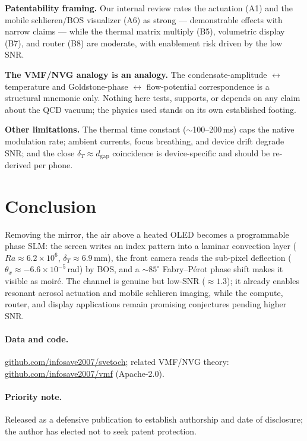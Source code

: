 \documentclass[11pt]{article}
\begin{document}
\textbf{Patentability framing.} Our internal review rates the actuation (A1) and the mobile
schlieren/BOS visualizer (A6) as strong --- demonstrable effects with narrow claims --- while
the thermal matrix multiply (B5), volumetric display (B7), and router (B8) are moderate, with
enablement risk driven by the low SNR.

\textbf{The VMF/NVG analogy is an analogy.} The condensate-amplitude $\leftrightarrow$
temperature and Goldstone-phase $\leftrightarrow$ flow-potential correspondence is a structural
mnemonic only. Nothing here tests, supports, or depends on any claim about the QCD vacuum; the
physics used stands on its own established footing.

\textbf{Other limitations.} The thermal time constant ($\sim$100--200\,ms) caps the native
modulation rate; ambient currents, focus breathing, and device drift degrade SNR; and the close
$\delta_T\approx d_\mathrm{gap}$ coincidence is device-specific and should be re-derived per phone.

\section{Conclusion}
Removing the mirror, the air above a heated OLED becomes a programmable phase SLM: the screen
writes an index pattern into a laminar convection layer ($Ra\approx6.2\times10^{6}$,
$\delta_T\approx6.9$\,mm), the front camera reads the sub-pixel deflection
($\theta_x\approx-6.6\times10^{-5}$\,rad) by BOS, and a $\sim85^{\circ}$ Fabry--P\'erot phase
shift makes it visible as moir\'e. The channel is genuine but low-SNR ($\approx1.3$); it
already enables resonant aerosol actuation and mobile schlieren imaging, while the compute,
router, and display applications remain promising conjectures pending higher SNR.

\paragraph{Data and code.} \href{https://github.com/infosave2007/svetoch}{github.com/infosave2007/svetoch}; related VMF/NVG theory: \href{https://github.com/infosave2007/vmf}{github.com/infosave2007/vmf}
(Apache-2.0).
\paragraph{Priority note.} Released as a defensive publication to establish authorship and date
of disclosure; the author has elected not to seek patent protection.
\end{document}
